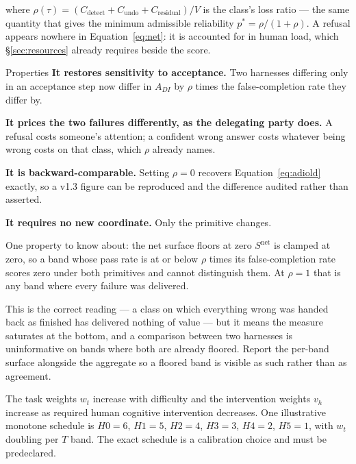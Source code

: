 \documentclass[11pt]{article}
\theoremstyle{definition}
\begin{document}
where $\rho(\tau) = (C_{\text{detect}} + C_{\text{undo}} + C_{\text{residual}})/V$ is the class's loss ratio --- the same quantity that gives the minimum admissible reliability $p^{*} = \rho/(1+\rho)$. A refusal appears nowhere in Equation~\eqref{eq:net}: it is accounted for in human load, which \S\ref{sec:resources} already requires beside the score.

\begin{claimbox}{Properties}
\textbf{It restores sensitivity to acceptance.} Two harnesses differing only in an acceptance step now differ in $A_{DI}$ by $\rho$ times the false-completion rate they differ by.

\textbf{It prices the two failures differently, as the delegating party does.} A refusal costs someone's attention; a confident wrong answer costs whatever being wrong costs on that class, which $\rho$ already names.

\textbf{It is backward-comparable.} Setting $\rho = 0$ recovers Equation~\eqref{eq:adiold} exactly, so a v1.3 figure can be reproduced and the difference audited rather than asserted.

\textbf{It requires no new coordinate.} Only the primitive changes.
\end{claimbox}

\begin{cautionbox}{One property to know about: the net surface floors at zero}
$S^{\text{net}}$ is clamped at zero, so a band whose pass rate is at or below
$\rho$ times its false-completion rate scores zero under both primitives and
cannot distinguish them. At $\rho = 1$ that is any band where every failure was
delivered.

This is the correct reading --- a class on which everything wrong was handed
back as finished has delivered nothing of value --- but it means the measure
saturates at the bottom, and a comparison between two harnesses is uninformative
on bands where both are already floored. Report the per-band surface alongside
the aggregate so a floored band is visible as such rather than as agreement.
\end{cautionbox}

\sloppy The task weights $w_t$ increase with difficulty and the intervention weights $v_h$ increase as required human cognitive intervention decreases. One illustrative monotone schedule is $H0{=}6$, $H1{=}5$, $H2{=}4$, $H3{=}3$, $H4{=}2$, $H5{=}1$, with $w_t$ doubling per $T$ band. The exact schedule is a calibration choice and must be predeclared.
\end{document}

